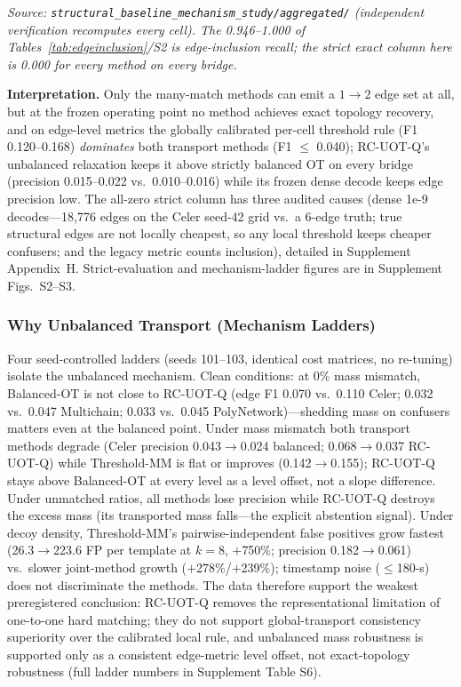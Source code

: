 \emph{Source: \texttt{structural\_baseline\_mechanism\_study/aggregated/} (independent verification recomputes every cell). The 0.946--1.000 of Tables~\ref{tab:edgeinclusion}/S2 is edge-inclusion recall; the strict exact column here is 0.000 for every method on every bridge.}

\textbf{Interpretation.} Only the many-match methods can emit a $1{\to}2$ edge set at all, but at the frozen operating point no method achieves exact topology recovery, and on edge-level metrics the globally calibrated per-cell threshold rule (F1 0.120--0.168) \emph{dominates} both transport methods (F1 $\le$ 0.040); RC-UOT-Q's unbalanced relaxation keeps it above strictly balanced OT on every bridge (precision 0.015--0.022 vs.\ 0.010--0.016) while its frozen dense decode keeps edge precision low. The all-zero strict column has three audited causes (dense 1e-9 decodes---18{,}776 edges on the Celer seed-42 grid vs.\ a 6-edge truth; true structural edges are not locally cheapest, so any local threshold keeps cheaper confusers; and the legacy metric counts inclusion), detailed in Supplement Appendix~H. Strict-evaluation and mechanism-ladder figures are in Supplement Figs.~S2--S3.

\subsubsection{Why Unbalanced Transport (Mechanism Ladders)}
\label{sec:whyunbalanced}

Four seed-controlled ladders (seeds 101--103, identical cost matrices, no re-tuning) isolate the unbalanced mechanism. Clean conditions: at 0\% mass mismatch, Balanced-OT is not close to RC-UOT-Q (edge F1 0.070 vs.\ 0.110 Celer; 0.032 vs.\ 0.047 Multichain; 0.033 vs.\ 0.045 PolyNetwork)---shedding mass on confusers matters even at the balanced point. Under mass mismatch both transport methods degrade (Celer precision 0.043$\to$0.024 balanced; 0.068$\to$0.037 RC-UOT-Q) while Threshold-MM is flat or improves (0.142$\to$0.155); RC-UOT-Q stays above Balanced-OT at every level as a level offset, not a slope difference. Under unmatched ratios, all methods lose precision while RC-UOT-Q destroys the excess mass (its transported mass falls---the explicit abstention signal). Under decoy density, Threshold-MM's pairwise-independent false positives grow fastest (26.3$\to$223.6 FP per template at $k{=}8$, $+$750\%; precision 0.182$\to$0.061) vs.\ slower joint-method growth ($+$278\%/$+$239\%); timestamp noise ($\le$180-s) does not discriminate the methods. The data therefore support the weakest preregistered conclusion: RC-UOT-Q removes the representational limitation of one-to-one hard matching; they do not support global-transport consistency superiority over the calibrated local rule, and unbalanced mass robustness is supported only as a consistent edge-metric level offset, not exact-topology robustness (full ladder numbers in Supplement Table S6).

